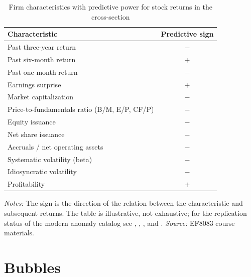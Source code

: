 \begin{table}[htbp]
\centering
\begin{threeparttable}
\caption{Firm characteristics with predictive power for stock returns in the cross-section}
\label{tab:characteristics}
\begin{tabular}{lc}
\toprule
Characteristic & Predictive sign \\
\midrule
Past three-year return & $-$ \\
Past six-month return & $+$ \\
Past one-month return & $-$ \\
Earnings surprise & $+$ \\
Market capitalization & $-$ \\
Price-to-fundamentals ratio (B/M, E/P, CF/P) & $-$ \\
Equity issuance & $-$ \\
Net share issuance & $-$ \\
Accruals / net operating assets & $-$ \\
Systematic volatility (beta) & $-$ \\
Idiosyncratic volatility & $-$ \\
Profitability & $+$ \\
\bottomrule
\end{tabular}
\begin{tablenotes}[flushleft]\small
\item \textit{Notes:} The sign is the direction of the relation between the characteristic and subsequent returns. The table is illustrative, not exhaustive; for the replication status of the modern anomaly catalog see \citet{harvey2016}, \citet{mclean2016}, \citet{hou2020}, and \citet{chen2022}. \textit{Source:} EF8083 course materials.
\end{tablenotes}
\end{threeparttable}
\end{table}

\section{Bubbles}
\label{sec:bubbles}

